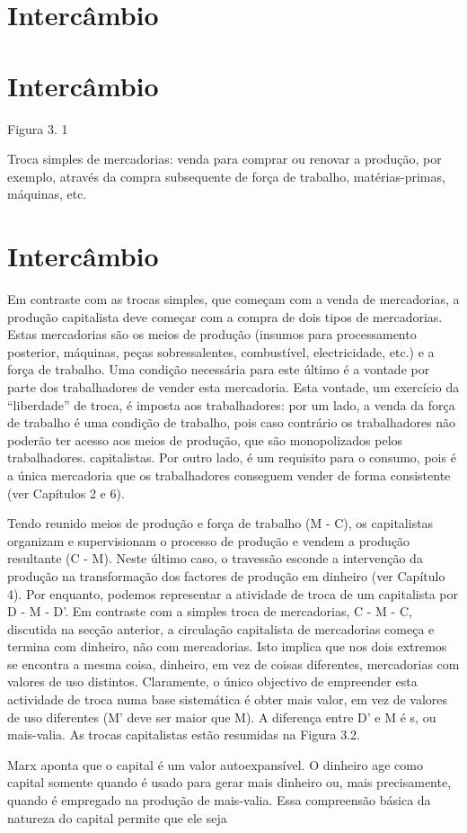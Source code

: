 \section{Intercâmbio}
 \par 
\section{Intercâmbio}
 \par 
Figura {\color{blue}3}. {\color{blue} 1 } {\par} Troca simples de mercadorias: venda para comprar ou renovar a produção, por exemplo, através da compra subsequente de força de trabalho, matérias-primas, máquinas, etc.
 \par 
\section{Intercâmbio}
 \par 
Em contraste com as trocas simples, que começam com a venda de mercadorias, a produção capitalista deve começar com a compra de dois tipos de mercadorias. Estas mercadorias são os meios de produção (insumos para processamento posterior, máquinas, peças sobressalentes, combustível, electricidade, etc.) e a força de trabalho. Uma condição necessária para este último é a vontade por parte dos trabalhadores de vender esta mercadoria. Esta vontade, um exercício da “liberdade” de troca, é imposta aos trabalhadores: por um lado, a venda da força de trabalho é uma condição de trabalho, pois caso contrário os trabalhadores não poderão ter acesso aos meios de produção, que são monopolizados pelos trabalhadores. capitalistas. Por outro lado, é um requisito para o consumo, pois é a única mercadoria que os trabalhadores conseguem vender de forma consistente (ver Capítulos {\color{blue}2} e {\color{blue}6}).
 \par 
Tendo reunido meios de produção e força de trabalho (M - C), os capitalistas organizam e supervisionam o processo de produção e vendem a produção resultante (C - M). Neste último caso, o travessão esconde a intervenção da produção na transformação dos factores de produção em dinheiro (ver Capítulo {\color{blue}4}). Por enquanto, podemos representar a atividade de troca de um capitalista por D - M - D'. Em contraste com a simples troca de mercadorias, C - M - C, discutida na secção anterior, a circulação capitalista de mercadorias começa e termina com dinheiro, não com mercadorias. Isto implica que nos dois extremos se encontra a mesma coisa, dinheiro, em vez de coisas diferentes, mercadorias com valores de uso distintos. Claramente, o único objectivo de empreender esta actividade de troca numa base sistemática é obter mais valor, em vez de valores de uso diferentes (M' deve ser maior que M). A diferença entre D' e M é s, ou mais-valia. As trocas capitalistas estão resumidas na Figura {\color{blue}3}.2.
 \par 
Marx aponta que o capital é um valor autoexpansível. O dinheiro age como capital somente quando é usado para gerar mais dinheiro ou, mais precisamente, quando é empregado na produção de mais-valia. Essa compreensão básica da natureza do capital permite que ele seja
 \par 
